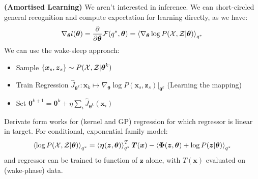 \begin{definition}{\textbf{(Amortised Learning)}}
    We aren't interested in inference. We can short-circled general recognition and compute expectation for learning directly, as we have:
    \begin{equation*}
        \nabla_{\boldsymbol \theta} l (\boldsymbol \theta) = \frac{\partial}{\partial \boldsymbol \theta} \mathcal{F}(q^*, \boldsymbol \theta) = \left\langle \nabla_{\boldsymbol \theta}\log P(\mathcal{X},\mathcal{Z}|\boldsymbol \theta) \right\rangle_{q^*}
    \end{equation*}
    We can use the wake-sleep approach:
    \begin{itemize}
        \item Sample $\left\{ \boldsymbol x_s, \boldsymbol z_s \right\} \sim P(\mathcal{X},\mathcal{Z}|\boldsymbol \theta^k)$
        \item Train Regression $\hat{J}_{\boldsymbol \theta^k} : \boldsymbol x_k\mapsto \nabla_{\boldsymbol \theta} \log P(\boldsymbol x_s, \boldsymbol z_s)|_{\boldsymbol \theta^k}$ (Learning the mapping)
        \item Set $\boldsymbol \theta^{k+1} = \boldsymbol \theta^k + \eta\sum_i \hat{J}_{\boldsymbol \theta^k}(\boldsymbol x_i)$
    \end{itemize}
    Derivate form works for (kernel and GP) regression for which regressor is linear in target. For conditional, exponential family model:
    \begin{equation*}
        \left\langle \log P(\mathcal{X},\mathcal{Z} | \boldsymbol \theta) \right\rangle_{q^*} = \left\langle \boldsymbol \eta(\boldsymbol z, \boldsymbol \theta) \right\rangle_{q^*}^T\boldsymbol T(\boldsymbol x) - \left\langle \boldsymbol \Phi(\boldsymbol z, \boldsymbol \theta) + \log P(\boldsymbol z|\boldsymbol \theta) \right\rangle_{q^*}
    \end{equation*}
    and regressor can be trained to function of $\boldsymbol z$ alone, with $T(\boldsymbol x)$ evaluated on (wake-phase) data. 
\end{definition}

